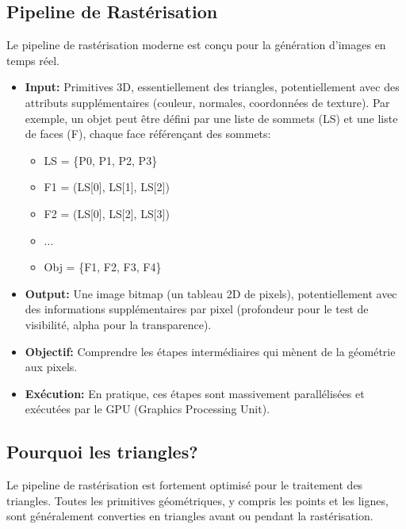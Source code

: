 \documentclass{article}
\begin{document}
\subsection{Pipeline de Rastérisation}
Le pipeline de rastérisation moderne est conçu pour la génération d'images en temps réel.
\begin{itemize}
    \item \textbf{Input:} Primitives 3D, essentiellement des triangles, potentiellement avec des attributs supplémentaires (couleur, normales, coordonnées de texture). Par exemple, un objet peut être défini par une liste de sommets (LS) et une liste de faces (F), chaque face référençant des sommets:
    \begin{itemize}
        \item LS = \{P0, P1, P2, P3\}
        \item F1 = (LS[0], LS[1], LS[2])
        \item F2 = (LS[0], LS[2], LS[3])
        \item ...
        \item Obj = \{F1, F2, F3, F4\}
    \end{itemize}
    \item \textbf{Output:} Une image bitmap (un tableau 2D de pixels), potentiellement avec des informations supplémentaires par pixel (profondeur pour le test de visibilité, alpha pour la transparence).
    \item \textbf{Objectif:} Comprendre les étapes intermédiaires qui mènent de la géométrie aux pixels.
    \item \textbf{Exécution:} En pratique, ces étapes sont massivement parallélisées et exécutées par le GPU (Graphics Processing Unit).
\end{itemize}

\subsection{Pourquoi les triangles?}
Le pipeline de rastérisation est fortement optimisé pour le traitement des triangles. Toutes les primitives géométriques, y compris les points et les lignes, sont généralement converties en triangles avant ou pendant la rastérisation.
\end{document}
